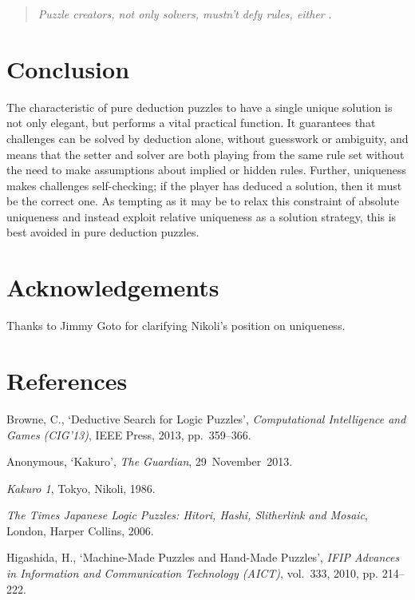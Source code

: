 \documentclass{gapd}
\begin{document}
\begin{quote}
  \textit{Puzzle creators, not only solvers, mustn't defy rules, either}
  \cite[p216]{Higashida2010}.
\end{quote}

\section{Conclusion}
\label{sec:Conclusion}

The characteristic of pure deduction puzzles to have a single unique
solution is not only elegant, but performs a vital practical function.
It guarantees that challenges can be solved by deduction alone,
without guesswork or ambiguity, and means that the setter and solver
are both playing from the same rule set without the need to make
assumptions about implied or hidden rules.  Further, uniqueness makes
challenges self-checking; if the player has deduced a solution, then
it must be the correct one.  As tempting as it may be to relax this
constraint of absolute uniqueness and instead exploit relative
uniqueness as a solution strategy, this is best avoided in pure
deduction puzzles.

\section*{Acknowledgements}

Thanks to Jimmy Goto for clarifying Nikoli's position on uniqueness.

\section*{References}

\begin{thebibliography}{4}

 Browne, C., `Deductive Search for Logic Puzzles',
  \textit{Computational Intelligence and Games (CIG'13)}, IEEE Press,
  2013, pp.~359--366.

 Anonymous, `Kakuro', \textit{The Guardian},
  29~November~2013.

 \textit{Kakuro 1}, Tokyo, Nikoli, 1986.

 \textit{The Times Japanese Logic Puzzles: Hitori, Hashi,
    Slitherlink and Mosaic}, London, Harper Collins, 2006.

 Higashida, H., `Machine-Made Puzzles and
  Hand-Made Puzzles', \textit{IFIP Advances in Information and
    Communication Technology (AICT)}, vol.~333, 2010, pp. 214--222.

\end{thebibliography}

\end{document}
